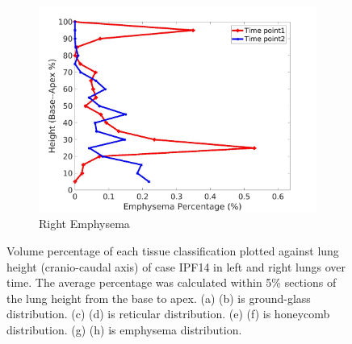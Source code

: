 \begin{figure}[H]
\begin{subfigure}{.42\linewidth}
  \includegraphics[width=\linewidth,trim={{.0\wd0} {.0\wd0} {.0\wd0} {.0\wd0}},clip]{Appendix/Image_AppexA/BaseToApex/IPF14RightLungEmphysemaDiseaseAgainstHeight.jpg}
  \caption{Right Emphysema}
  \label{fig:IPF14DiseaseAgainstHeight-h}
\end{subfigure}
\caption{Volume percentage of each tissue classification plotted against lung height (cranio-caudal axis) of case IPF14 in left and right lungs over time. The average percentage was calculated within 5\% sections of the lung height from the base to apex. (a) (b) is ground-glass distribution. (c) (d) is reticular distribution. (e) (f) is honeycomb distribution. (g) (h) is emphysema distribution.}
\label{fig:IPF14DiseaseAgainstHeight}
\end{figure}

